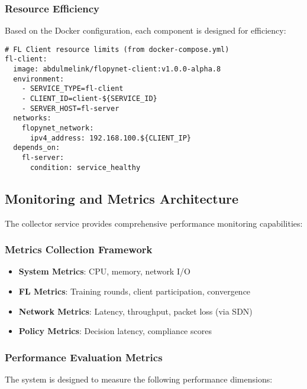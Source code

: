 \subsubsection{Resource Efficiency}
Based on the Docker configuration, each component is designed for efficiency:

\begin{lstlisting}[style=dockercode, caption=Resource-Aware Container Configuration]
# FL Client resource limits (from docker-compose.yml)
fl-client:
  image: abdulmelink/flopynet-client:v1.0.0-alpha.8
  environment:
    - SERVICE_TYPE=fl-client
    - CLIENT_ID=client-${SERVICE_ID}
    - SERVER_HOST=fl-server
  networks:
    flopynet_network:
      ipv4_address: 192.168.100.${CLIENT_IP}
  depends_on:
    fl-server:
      condition: service_healthy
\end{lstlisting}

\subsection{Monitoring and Metrics Architecture}

The collector service provides comprehensive performance monitoring capabilities:

\subsubsection{Metrics Collection Framework}
\begin{itemize}
    \item \textbf{System Metrics}: CPU, memory, network I/O
    \item \textbf{FL Metrics}: Training rounds, client participation, convergence
    \item \textbf{Network Metrics}: Latency, throughput, packet loss (via SDN)
    \item \textbf{Policy Metrics}: Decision latency, compliance scores
\end{itemize}

\subsubsection{Performance Evaluation Metrics}

The system is designed to measure the following performance dimensions:

